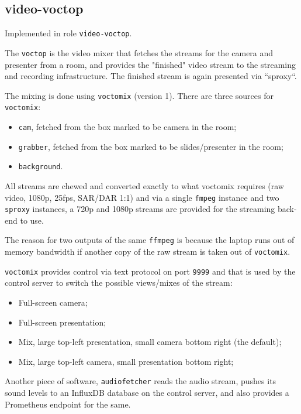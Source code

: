 \documentclass{article}
\begin{document}
\subsection{video-voctop}

Implemented in role \texttt{video-voctop}.

The \texttt{voctop} is the video mixer that fetches the streams for the camera and presenter from a room, and provides the "finished" video stream to the streaming and recording infrastructure. The finished stream is again presented via ``sproxy``.

The mixing is done using \texttt{voctomix} (version 1). There are three sources for \texttt{voctomix}:

\begin{itemize}
  \item \texttt{cam}, fetched from the box marked to be camera in the room;
  \item \texttt{grabber}, fetched from the box marked to be slides/presenter in the room;
  \item \texttt{background}.
\end{itemize}

All streams are chewed and converted exactly to what voctomix requires (raw video, 1080p, 25fps, SAR/DAR 1:1) and via a single \texttt{fmpeg} instance and two \texttt{sproxy} instances, a 720p and 1080p streams are provided for the streaming back-end to use.

The reason for two outputs of the same \texttt{ffmpeg} is because the laptop runs out of memory bandwidth if another copy of the raw stream is taken out of \texttt{voctomix}.

\texttt{voctomix} provides control via text protocol on port \texttt{9999} and that is used by the control server to switch the possible views/mixes of the stream:

\begin{itemize}
  \item Full-screen camera;
  \item Full-screen presentation;
  \item Mix, large top-left presentation, small camera bottom right (the default);
  \item Mix, large top-left camera, small presentation bottom right;
\end{itemize}

Another piece of software, \texttt{audiofetcher} reads the audio stream, pushes its sound levels to an InfluxDB database on the control server, and also provides a Prometheus endpoint for the same.
\end{document}
